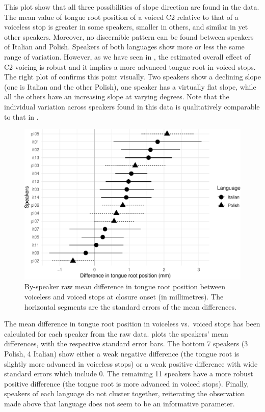 \documentclass[12pt,]{article}
\begin{document}
This plot show that all three possibilities of slope direction are found
in the data. The mean value of tongue root position of a voiced C2
relative to that of a voiceless stop is greater in some speakers,
smaller in others, and similar in yet other speakers. Moreover, no
discernible pattern can be found between speakers of Italian and Polish.
Speakers of both languages show more or less the same range of
variation. However, as we have seen in , the estimated
overall effect of C2 voicing is robust and it implies a more advanced
tongue root in voiced stops. The right plot of 
confirms this point visually. Two speakers show a declining slope (one
is Italian and the other Polish), one speaker has a virtually flat
slope, while all the others have an increasing slope at varying degrees.
Note that the individual variation across speakers found in this data is
qualitatively comparable to that in \citet{ahn2018}.

\begin{figure}
\includegraphics[width=\linewidth]{2018-tra_files/figure-latex/trp-difference-1} \caption{By-speaker raw mean difference in tongue root position between voiceless and voiced stops at closure onset (in millimetres). The horizontal segments are the standard errors of the mean differences.}\label{f:trp-difference}
\end{figure}

The mean difference in tongue root position in voiceless vs.~voiced
stops has been calculated for each speaker from the raw data.
 plots the speakers' mean differences, with the
respective standard error bars. The bottom 7 speakers (3 Polish, 4
Italian) show either a weak negative difference (the tongue root is
slightly more advanced in voiceless stops) or a weak positive difference
with wide standard errors which include 0. The remaining 11 speakers
have a more robust positive difference (the tongue root is more advanced
in voiced stops). Finally, speakers of each language do not cluster
together, reiterating the observation made above that language does not
seem to be an informative parameter.
\end{document}
